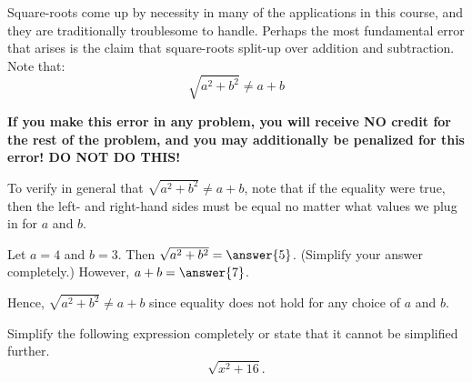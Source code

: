 \documentclass{ximera}
\author{}
\begin{document}
\begin{exercise}

  Square-roots come up by necessity in many of the applications in
  this course, and they are traditionally troublesome to
  handle. Perhaps the most fundamental error that arises is the claim
  that square-roots split-up over addition and subtraction. Note that:
  \[
  \sqrt{a^2+b^2} \ne a+ b
  \]
  \begin{warning}
    \textbf{If you make this error in any problem, you will receive NO
      credit for the rest of the problem, and you may additionally be
      penalized for this error! DO NOT DO THIS!}
  \end{warning}


\begin{problem}
  To verify in general that $\sqrt{a^2+b^2} \ne a+b$, note that if the equality were true, then the left- and right-hand sides must be equal no matter what values we plug in for $a$ and $b$.
  
  Let $a = 4$ and $b = 3$.
  Then $\sqrt{a^2 + b^2} = \answer{5}$.
  (Simplify your answer completely.)
  However, $a + b = \answer{7}$.
  
  Hence, $\sqrt{a^2 + b^2} \ne a + b$ since equality does not hold for any choice of $a$ and $b$.
\end{problem}

\begin{problem}
  Simplify the following expression completely or state that it cannot be simplified further.
  \[
    \sqrt{x^2 + 16}.
  \]
  \begin{multipleChoice}
  \end{multipleChoice}
\end{problem}

\end{exercise}
\end{document}
